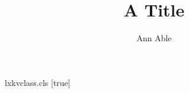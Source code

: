 \begin{filecontents*}[overwrite]{lxkvclass.cls}
\RequirePackage{xkeyval}
[true]{}
\newcommand\ead[2][]{\setkeys{lxead}{#1}\def\@ead{#2}}
\end{filecontents*}
\documentclass{lxkvclass}

\title{A Title}
\author{Ann Able}
\maketitle
Body text.

